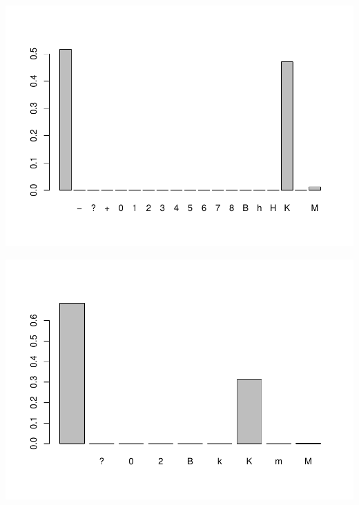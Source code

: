 \documentclass[
]{article}
\newenvironment{Shaded}{\begin{snugshade}}{\end{snugshade}}
\newcommand{\FunctionTok}[1]{\textcolor[rgb]{0.00,0.00,0.00}{#1}}
\newcommand{\NormalTok}[1]{#1}
\newcommand{\SpecialCharTok}[1]{\textcolor[rgb]{0.00,0.00,0.00}{#1}}
\begin{document}
\begin{Shaded}
\end{Shaded}

\includegraphics{RepData_PeerAssessment2_files/figure-latex/checking scales of damage-1.pdf}

\begin{Shaded}
\end{Shaded}

\includegraphics{RepData_PeerAssessment2_files/figure-latex/checking scales of damage-2.pdf}
\end{document}
